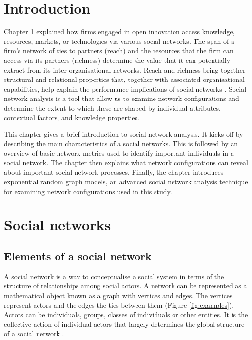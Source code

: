 \section{Introduction}

Chapter 1 explained how firms engaged in open innovation access knowledge, resources, markets, or technologies via various social networks. The span of a firm’s network of ties to partners (reach) and the resources that the firm can access via its partners (richness) determine the value that it can potentially extract from its inter-organisational networks. Reach and richness bring together structural and relational properties that, together with associated organisational capabilities, help explain the performance implications of social networks \citep{gulati2011networks}. Social network analysis is a tool that allow us to examine network configurations and determine the extent to which these are shaped by individual attributes, contextual factors, and knowledge properties. \medskip

This chapter gives a brief introduction to social network analysis. It kicks off by describing the main characteristics of a social networks. This is followed by an overview of basic network metrics used to identify important individuals in a social network. The chapter then explains what network configurations can reveal about important social network processes. Finally, the chapter introduces exponential random graph models, an advanced social network analysis technique for examining network configurations used in this study. \medskip  

\section{Social networks}

\subsection{Elements of a social network}

A social network is a way to conceptualise a social system in terms of the structure of relationships among social actors. A network can be represented as a mathematical object known as a graph with vertices and edges. The vertices represent actors and the edges the ties between them (Figure \ref{fig:examples}). Actors can be individuals, groups, classes of individuals or other entities. It is the collective action of individual actors that largely determines the global structure of a social network \citep{robins2015doing}. 

